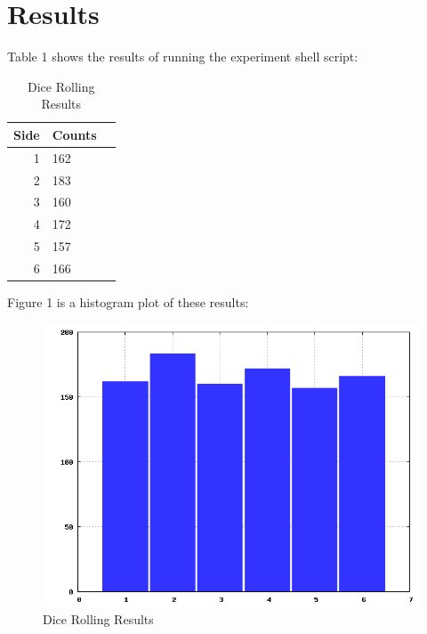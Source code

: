 \documentclass{article}
\begin{document}
\section*{Results}

Table 1 shows the results of running the experiment shell script:

\begin{table}[h!]
	\centering
	\begin{tabular}{r|l||c}
	Side & Counts\\
	\hline
	1 & 162\\
	2 & 183\\
	3 & 160\\
	4 & 172\\
	5 & 157\\
	6 & 166\\
	\end{tabular}
	\caption{Dice Rolling Results}
	\label{tbl:rolls}
\end{table}

Figure 1 is a histogram plot of these results:

\begin{figure}[h!]
\centering
\includegraphics[width=5in]{results.png}
\caption{Dice Rolling Results}
\label{fig:rolls}
\end{figure}
\end{document}

